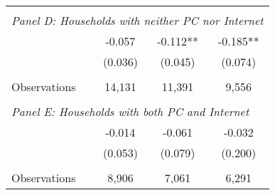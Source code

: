 {\begin{tabular}{lccc}
&  &  &   \\
\multicolumn{4}{l}{\textit{Panel D: Households with neither PC nor Internet}} \\
\hspace{3mm}        &      -0.057   &      -0.112** &      -0.185** \\
                    &     (0.036)   &     (0.045)   &     (0.074)   \\
                    &               &               &               \\
\hspace{3mm}Observations&      14,131   &      11,391   &       9,556   \\
 
&  &  &   \\
\multicolumn{4}{l}{\textit{Panel E: Households with both PC and Internet}} \\
\hspace{3mm}        &      -0.014   &      -0.061   &      -0.032   \\
                    &     (0.053)   &     (0.079)   &     (0.200)   \\
                    &               &               &               \\
\hspace{3mm}Observations&       8,906   &       7,061   &       6,291   \\
 

\bottomrule
\end{tabular}
}

